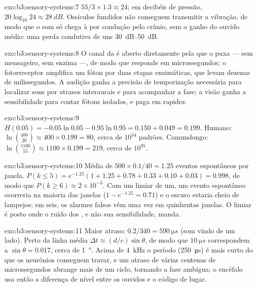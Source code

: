 \begin{solution}{exo:b3:sensory-systems:7}
$55/3\times 1.3 \approx 24$; em decibéis de pressão, $20\log_{10}24
\approx \qty{28}{dB}$. Ossículos fundidos não conseguem transmitir a
vibração, de modo que o som só chega à  por condução pelo crânio,
sem o ganho do ouvido médio: uma perda condutiva de uns
\qtyrange{30}{50}{dB}.
\end{solution}

\begin{solution}{exo:b3:sensory-systems:8}
O canal da  é aberto diretamente pela  que
o puxa --- sem mensageiro, sem enzima ---, de modo que responde em
microssegundos; o fotorreceptor amplifica um fóton por duas etapas
enzimáticas, que levam dezenas de milissegundos. A audição ganha a
precisão de temporização necessária para localizar sons por atrasos
interaurais e para acompanhar a fase; a visão ganha a sensibilidade para
contar fótons isolados, e paga em rapidez.
\end{solution}

\begin{solution}{exo:b3:sensory-systems:9}
$H(0.05) = -0.05\ln 0.05 - 0.95\ln 0.95 = 0.150 + 0.049 = 0.199$.
Humano: $\ln\binom{400}{20} \approx 400\times 0.199 = 80$, cerca de
$10^{34}$ padrões. Camundongo: $\ln\binom{1100}{55} \approx 1100\times 0.199
= 219$, cerca de $10^{95}$.
\end{solution}

\begin{solution}{exo:b3:sensory-systems:10}
Média de $500\times 0.1/40 = 1.25$ eventos espontâneos por janela. $P(k
\le 5) = e^{-1.25}(1 + 1.25 + 0.78 + 0.33 + 0.10 + 0.03) = 0.998$, de
modo que $P(k \ge 6) \approx 2\times 10^{-3}$. Com um limiar de um, um
evento espontâneo ocorreria na maioria das janelas ($1 - e^{-1.25} = 0.71$) e o escuro estaria cheio de lampejos; em seis, os alarmes falsos
vêm uma vez em quinhentas janelas. O limiar é posto onde o ruído dos
, e não sua sensibilidade, manda.
\end{solution}

\begin{solution}{exo:b3:sensory-systems:11}
Maior atraso: $0.2/340 = \qty{590}{\micro s}$ (som vindo de um lado).
Perto da linha média $\Delta t \approx (d/c)\sin\theta$, de modo que
$\qty{10}{\micro
s}$ correspondem a $\sin\theta = 0.017$, cerca de
\qty{1}{\degree}. Acima de \qty{4}{kHz} o período
(\qty{250}{\micro s}) é mais curto do que os neurônios conseguem travar,
e um atraso de várias centenas de microssegundos abrange mais de um
ciclo, tornando a fase ambígua; o encéfalo usa então a diferença de
nível entre os ouvidos e o código de lugar.
\end{solution}

